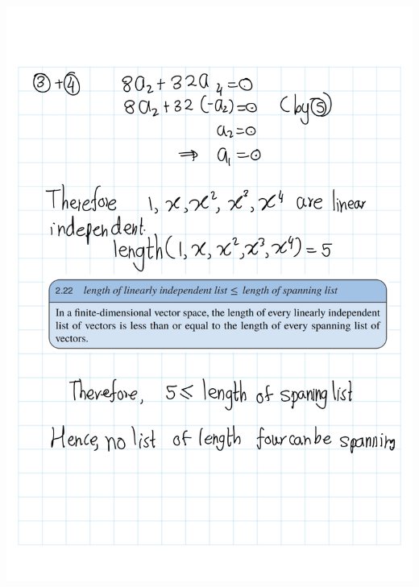 \documentclass[
]{book}
\theoremstyle{definition}
\theoremstyle{definition}
\theoremstyle{definition}
\theoremstyle{definition}
\theoremstyle{remark}
\begin{document}
\includegraphics{fig/Ex2A/Ex2A-20.png}
\end{document}
